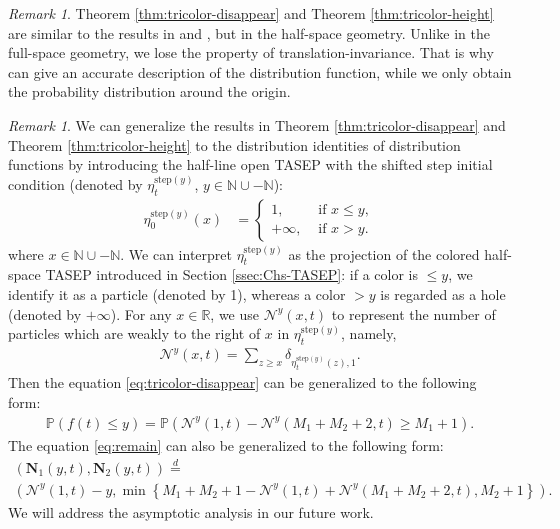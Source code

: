 \documentclass[12pt,a4paper]{amsart}
\theoremstyle{remark}
\newtheorem{remark}[theorem]{Remark}
\numberwithin{equation}{section} \numberwithin{theorem}{section}
\begin{document}
\begin{remark}
Theorem \ref{thm:tricolor-disappear} and Theorem \ref{thm:tricolor-height} are similar to the results in \cite[Proposition 6.1]{BB21} and \cite[Proposition 2.5]{BF22}, but in the half-space geometry. Unlike in the full-space geometry, we lose the property of translation-invariance. That is why \cite[Proposition 2.5]{BF22} can give an accurate description of the distribution function, while we only obtain the probability distribution around the origin.
\end{remark}

\begin{remark}
We can generalize the results in Theorem \ref{thm:tricolor-disappear} and Theorem \ref{thm:tricolor-height} to the distribution identities of distribution functions by introducing the half-line open TASEP with the shifted step initial condition (denoted by $\eta_{t}^{\mathrm{step}(y)}$, $y \in \mathbb{N} \cup -\mathbb{N}$): 
\begin{align*}
\eta_{0}^{\mathrm{step}(y)}(x)&=
\begin{cases}
1, & \text{ if } x \leq y, \\
+\infty, & \text{ if } x > y.
\end{cases}
\end{align*}
where $x \in \mathbb{N} \cup -\mathbb{N}$. We can interpret $\eta_{t}^{\mathrm{step}(y)}$ as the projection of the colored half-space TASEP introduced in Section \ref{ssec:Chs-TASEP}: if a color is $\leq y$, we identify it as a particle (denoted by 1), whereas a color $>y$ is regarded as a hole (denoted by $+\infty$). For any $x \in \mathbb{R}$, we use $\mathcal{N}^{y}(x,t)$ to represent the number of particles which are weakly to the right of $x$ in $\eta_{t}^{\mathrm{step}(y)}$, namely,
\begin{align*}
\mathcal{N}^{y}(x,t)=\sum_{z \geq x} \delta_{\eta_t^{\mathrm{step}(y)}(z), 1}.
\end{align*}
Then the equation \eqref{eq:tricolor-disappear} can be generalized to the following form:
\begin{align*}
\mathbb{P}(f(t) \leq y)=\mathbb{P}(\mathcal{N}^{y}(1,t)-\mathcal{N}^{y}(M_1+M_2+2,t)\geq M_1+1).
\end{align*}
The equation \eqref{eq:remain} can also be generalized to the following form:
\begin{multline*}
\left(\mathbf{N}_{1}(y,t) , \mathbf{N}_{2}(y,t) \right) \stackrel{d}{=} \\ 
\left( \mathcal{N}^{y}(1, t) -y, \min \left\{M_1+M_2+1- \mathcal{N}^{y}(1, t) + \mathcal{N}^{y} (M_1 + M_{2}+2, t), M_{2}+1 \right\} \right).
\end{multline*}
We will address the asymptotic analysis in our future work.
\end{remark}
\end{document}
